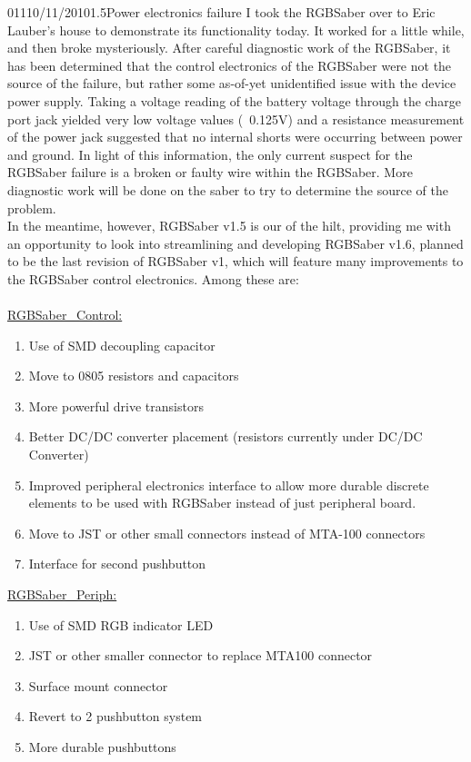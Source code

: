 \documentclass[12pt,letterpaper,onecolumn]{article}
\begin{document}
\begin{nbentry}{011}{10/11/2010}{1.5}{Power electronics failure}
	I took the RGBSaber over to Eric Lauber's house to demonstrate its functionality today. It worked for a little while, and then broke mysteriously. After careful diagnostic work of the RGBSaber, it has been determined that the control electronics of the RGBSaber were not the source of the failure, but rather some as-of-yet unidentified issue with the device power supply. Taking a voltage reading of the battery voltage through the charge port jack yielded very low voltage values (~0.125V) and a resistance measurement of the power jack suggested that no internal shorts were occurring between power and ground. In light of this information, the only current suspect for the RGBSaber failure is a broken or faulty wire within the RGBSaber. More diagnostic work will be done on the saber to try to determine the source of the problem. \\
	In the meantime, however, RGBSaber v1.5 is our of the hilt, providing me with an opportunity to look into streamlining and developing RGBSaber v1.6, planned to be the last revision of RGBSaber v1, which will feature many improvements to the RGBSaber control electronics. Among these are: \\ \\
\underline{RGBSaber\_Control:}
\begin{enumerate}
\item Use of SMD decoupling capacitor
\item Move to 0805 resistors and capacitors
\item More powerful drive transistors
\item Better DC/DC converter placement (resistors currently under DC/DC Converter)
\item Improved peripheral electronics interface to allow more durable discrete elements to be used with RGBSaber instead of just peripheral board.
\item Move to JST or other small connectors instead of MTA-100 connectors
\item Interface for second pushbutton
\end{enumerate}

\underline{RGBSaber\_Periph:}
\begin{enumerate}
\item Use of SMD RGB indicator LED
\item JST or other smaller connector to replace MTA100 connector
\item Surface mount connector
\item Revert to 2 pushbutton system
\item More durable pushbuttons
\end{enumerate}
\end{nbentry}
\end{document}
